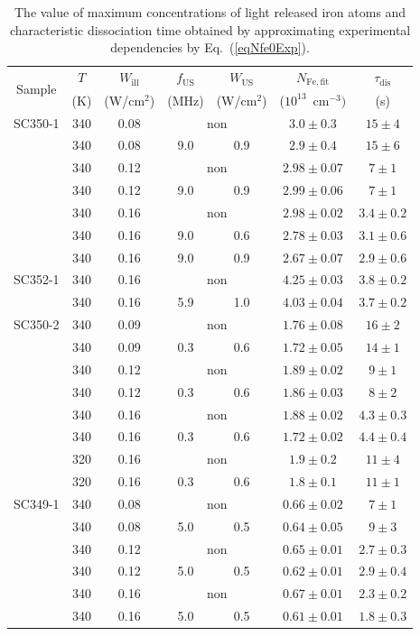 \documentclass[%
 aip,jap,
 amsmath,amssymb,
 reprint,%
]{revtex4-1}
\begin{document}
\textcolor[rgb]{0.00,0.07,1.00}{
\begin{table}
\caption{\label{tabSample}The value of maximum concentrations of light released iron atoms
and characteristic dissociation time obtained by approximating experimental dependencies by Eq.~(\ref{eqNfe0Exp}).
}
\begin{ruledtabular}
\begin{tabular}{ccccccc}
\multirow{2}{*}{Sample} &$T$&$W_\mathrm{ill}$&$f_\mathrm{US}$&$W_\mathrm{US}$& $N_\mathrm{Fe,fit}$
&$\tau_\mathrm{dis}$ \\
&(K)& (W/cm$^2$)& (MHz)&(W/cm$^2$)&($10^{13}$~cm$^{-3})$&(s) \\
\hline
SC350-1&340&0.08&\multicolumn{2}{c}{non}&$3.0\pm0.3$&$15\pm4$\\
&340&0.08&9.0&0.9&$2.9\pm0.4$&$15\pm6$\\
&340&0.12&\multicolumn{2}{c}{non}&$2.98\pm0.07$&$7\pm1$\\
&340&0.12&9.0&0.9&$2.99\pm0.06$&$7\pm1$\\
&340&0.16&\multicolumn{2}{c}{non}&$2.98\pm0.02$&$3.4\pm0.2$\\
&340&0.16&9.0&0.6&$2.78\pm0.03$&$3.1\pm0.6$\\
&340&0.16&9.0&0.9&$2.67\pm0.07$&$2.9\pm0.6$\\
SC352-1&340&0.16&\multicolumn{2}{c}{non}&$4.25\pm0.03$&$3.8\pm0.2$\\
&340&0.16&5.9&1.0&$4.03\pm0.04$&$3.7\pm0.2$\\
SC350-2&340&0.09&\multicolumn{2}{c}{non}&$1.76\pm0.08$&$16\pm2$\\
&340&0.09&0.3&0.6&$1.72\pm0.05$&$14\pm1$\\
&340&0.12&\multicolumn{2}{c}{non}&$1.89\pm0.02$&$9\pm1$\\
&340&0.12&0.3&0.6&$1.86\pm0.03$&$8\pm2$\\
&340&0.16&\multicolumn{2}{c}{non}&$1.88\pm0.02$&$4.3\pm0.3$\\
&340&0.16&0.3&0.6&$1.72\pm0.02$&$4.4\pm0.4$\\
&320&0.16&\multicolumn{2}{c}{non}&$1.9\pm0.2$&$11\pm4$\\
&320&0.16&0.3&0.6&$1.8\pm0.1$&$11\pm1$\\
SC349-1&340&0.08&\multicolumn{2}{c}{non}&$0.66\pm0.02$&$7\pm1$\\
&340&0.08&5.0&0.5&$0.64\pm0.05$&$9\pm3$\\
&340&0.12&\multicolumn{2}{c}{non}&$0.65\pm0.01$&$2.7\pm0.3$\\
&340&0.12&5.0&0.5&$0.62\pm0.01$&$2.9\pm0.4$\\
&340&0.16&\multicolumn{2}{c}{non}&$0.67\pm0.01$&$2.3\pm0.2$\\
&340&0.16&5.0&0.5&$0.61\pm0.01$&$1.8\pm0.3$\\
\end{tabular}
\end{ruledtabular}
\end{table}
}
\end{document}
